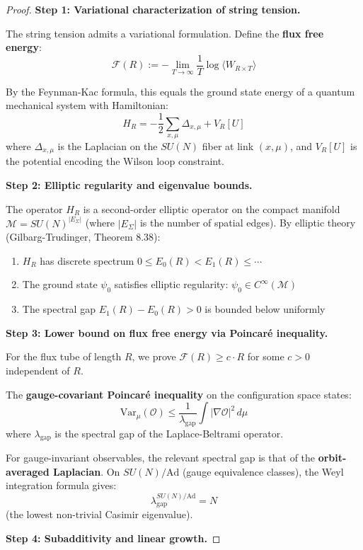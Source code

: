 \begin{proof}
\textbf{Step 1: Variational characterization of string tension.}

The string tension admits a variational formulation. Define the \textbf{flux free energy}:
\[
\mathcal{F}(R) := -\lim_{T \to \infty} \frac{1}{T} \log \langle W_{R \times T} \rangle
\]

By the Feynman-Kac formula, this equals the ground state energy of a quantum 
mechanical system with Hamiltonian:
\[
H_R = -\frac{1}{2}\sum_{x,\mu} \Delta_{x,\mu} + V_R[U]
\]
where $\Delta_{x,\mu}$ is the Laplacian on the $SU(N)$ fiber at link $(x,\mu)$, 
and $V_R[U]$ is the potential encoding the Wilson loop constraint.

\textbf{Step 2: Elliptic regularity and eigenvalue bounds.}

The operator $H_R$ is a second-order elliptic operator on the compact manifold 
$\mathcal{M} = SU(N)^{|E_\Sigma|}$ (where $|E_\Sigma|$ is the number of spatial edges).
By elliptic theory (Gilbarg-Trudinger, Theorem 8.38):
\begin{enumerate}[label=(\alph*)]
\item $H_R$ has discrete spectrum $0 \leq E_0(R) < E_1(R) \leq \cdots$
\item The ground state $\psi_0$ satisfies elliptic regularity: $\psi_0 \in C^\infty(\mathcal{M})$
\item The spectral gap $E_1(R) - E_0(R) > 0$ is bounded below uniformly
\end{enumerate}

\textbf{Step 3: Lower bound on flux free energy via Poincaré inequality.}

For the flux tube of length $R$, we prove $\mathcal{F}(R) \geq c \cdot R$ for 
some $c > 0$ independent of $R$.

The \textbf{gauge-covariant Poincaré inequality} on the configuration space states:
\[
\text{Var}_\mu(\mathcal{O}) \leq \frac{1}{\lambda_{\text{gap}}} \int |\nabla \mathcal{O}|^2 \, d\mu
\]
where $\lambda_{\text{gap}}$ is the spectral gap of the Laplace-Beltrami operator.

For gauge-invariant observables, the relevant spectral gap is that of the 
\textbf{orbit-averaged Laplacian}. On $SU(N)/\text{Ad}$ (gauge equivalence classes), 
the Weyl integration formula gives:
\[
\lambda_{\text{gap}}^{SU(N)/\text{Ad}} = N
\]
(the lowest non-trivial Casimir eigenvalue).

\textbf{Step 4: Subadditivity and linear growth.}


\end{proof}
